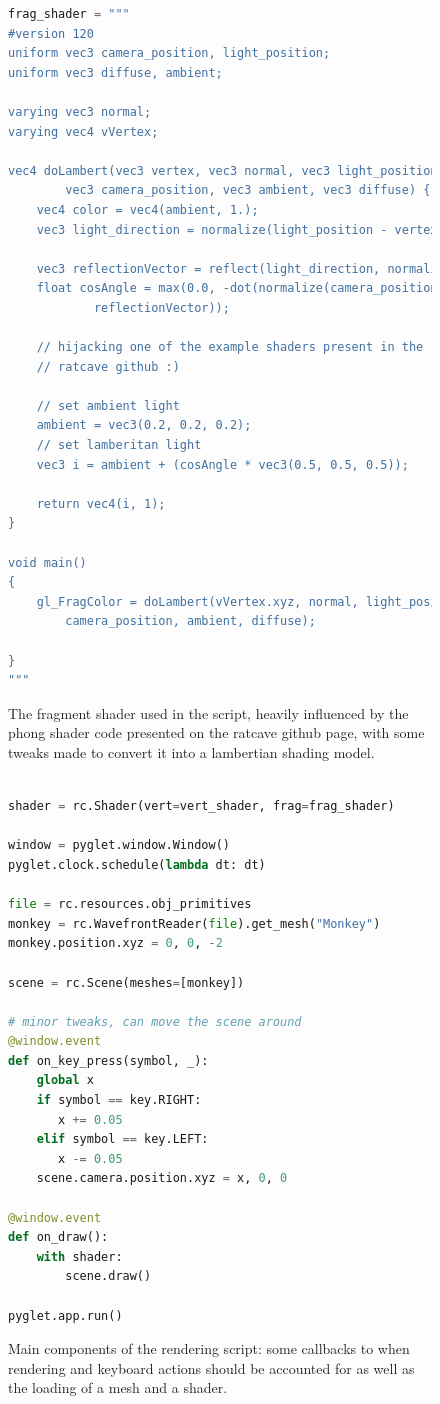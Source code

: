 \documentclass[a4paper, titlepage,12pt]{article}
\begin{document}
	\begin{figure}[H]
		\begin{center}
			\begin{lstlisting}[language=Python]
frag_shader = """
#version 120
uniform vec3 camera_position, light_position;
uniform vec3 diffuse, ambient;

varying vec3 normal;
varying vec4 vVertex;

vec4 doLambert(vec3 vertex, vec3 normal, vec3 light_position, 
		vec3 camera_position, vec3 ambient, vec3 diffuse) {
    vec4 color = vec4(ambient, 1.);
    vec3 light_direction = normalize(light_position - vertex);

    vec3 reflectionVector = reflect(light_direction, normalize(normal));
    float cosAngle = max(0.0, -dot(normalize(camera_position - vertex),
			reflectionVector));
	
	// hijacking one of the example shaders present in the
	// ratcave github :)

	// set ambient light
    ambient = vec3(0.2, 0.2, 0.2);
	// set lamberitan light
    vec3 i = ambient + (cosAngle * vec3(0.5, 0.5, 0.5));

    return vec4(i, 1);
}

void main()
{
    gl_FragColor = doLambert(vVertex.xyz, normal, light_position, 
		camera_position, ambient, diffuse);

}
"""
			\end{lstlisting}
			\caption{The fragment shader used in the script, heavily influenced by the phong shader code presented on the ratcave github page, with some tweaks made to convert it into a lambertian shading model.}
		\end{center}
	\end{figure}
	\begin{figure}[H]
		\begin{center}
			\begin{lstlisting}[language=Python]

shader = rc.Shader(vert=vert_shader, frag=frag_shader)

window = pyglet.window.Window()
pyglet.clock.schedule(lambda dt: dt)

file = rc.resources.obj_primitives
monkey = rc.WavefrontReader(file).get_mesh("Monkey")
monkey.position.xyz = 0, 0, -2

scene = rc.Scene(meshes=[monkey])

# minor tweaks, can move the scene around
@window.event
def on_key_press(symbol, _):
    global x
    if symbol == key.RIGHT:
       x += 0.05
    elif symbol == key.LEFT:
       x -= 0.05
    scene.camera.position.xyz = x, 0, 0

@window.event
def on_draw():
    with shader:
        scene.draw()

pyglet.app.run()
			\end{lstlisting}
			\caption{Main components of the rendering script: some callbacks to when rendering and keyboard actions should be accounted for as well as the loading of a mesh and a shader.}
		\end{center}
	\end{figure}

	\newpage
	\printbibliography
\end{document}
